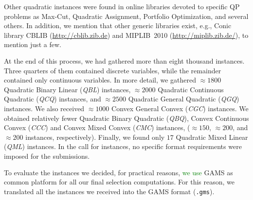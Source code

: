 Other quadratic instances were found in online libraries devoted to
specific QP problems as Max-Cut, Quadratic Assignment, Portfolio
Optimization, and several others. {In addition, we mention
that other generic libraries exist, e.g., 
Conic library CBLIB (\url{http://cblib.zib.de}) and 
MIPLIB~2010 (\url{http://miplib.zib.de/}), to mention just a few.}

At the end of this process, we had gathered more than eight thousand
instances. Three quarters of them contained discrete variables, while
the remainder contained only continuous variables. In more detail,
we gathered $\approx 1800$ Quadratic Binary Linear (\textit{QBL}) instances,
$\approx 2000$ Quadratic Continuous Quadratic (\textit{QCQ}) instances,
and $\approx 2500$ Quadratic General Quadratic (\textit{QGQ}) instances. We
also received $\approx 1000$ Convex General Convex (\textit{CGC}) instances. We
obtained relatively fewer Quadratic Binary Quadratic (\textit{QBQ}), Convex
Continuous Convex (\textit{CCC}) and Convex Mixed Convex (\textit{CMC}) instances,
($\approx 150$, $\approx 200$, and $\approx 200$ instances, respectively).
Finally, we found only $17$ Quadratic Mixed
Linear (\textit{QML}) instances. In the call for instances, no specific format
requirements were imposed for the submissions.

To evaluate the instances we decided, for practical reasons, \textcolor{green}{we use}
GAMS as common platform for all our final selection computations.
For this reason, we translated all the
instances we received into the GAMS format (\texttt{.gms}).
%


